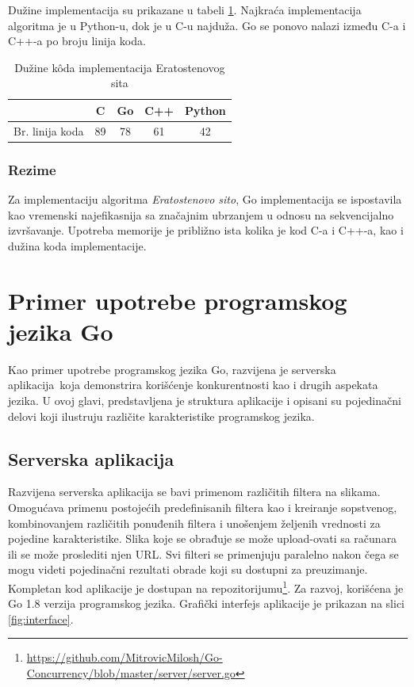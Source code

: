 \documentclass[12pt,oneside]{memoir}
\begin{document}
Dužine implementacija su prikazane u tabeli \ref{tab:prime2}. Najkraća implementacija algoritma je u Python-u, dok je u C-u najduža. Go se ponovo nalazi između C-a i C++-a po broju linija koda.

\begin{table}
\begin{center}
\caption{Dužine k\^{o}da implementacija Eratostenovog sita}
\begin{tabular}{|c|c|c|c|c|}
\hline
		&  C  		&Go 	& C++ & Python 	 \\ \hline
Br. linija koda& 89		& 78	&61	&42		 \\ \hline
\end{tabular}
\label{tab:prime2}
\end{center}
\end{table}


\subsection{Rezime}

Za implementaciju algoritma \textit{Eratostenovo sito}, Go implementacija se ispostavila kao vremenski najefikasnija sa značajnim ubrzanjem u odnosu na sekvencijalno izvršavanje. Upotreba memorije je približno ista kolika je kod C-a i C++-a, kao i dužina koda implementacije.


\chapter{Primer upotrebe programskog jezika Go}

Kao primer upotrebe programskog jezika Go, razvijena je serverska aplikacija\ koja demonstrira korišćenje konkurentnosti kao i drugih aspekata jezika. U ovoj glavi, predstavljena je struktura aplikacije i opisani su pojedinačni delovi koji ilustruju različite karakteristike programskog jezika. 

\section{Serverska aplikacija}

Razvijena serverska aplikacija se bavi primenom različitih filtera na slikama. Omogućava primenu postojećih predefinisanih filtera kao i kreiranje sopstvenog, kombinovanjem različitih ponuđenih filtera i unošenjem željenih vrednosti za pojedine karakteristike. Slika koje se obrađuje se može upload-ovati sa računara ili se može proslediti njen URL. Svi filteri se primenjuju paralelno nakon čega se mogu videti pojedinačni rezultati obrade koji su dostupni za preuzimanje. Kompletan kod aplikacije je dostupan na repozitorijumu\footnote{\url{https://github.com/MitrovicMilosh/Go-Concurrency/blob/master/server/server.go}}. Za razvoj, korišćena je Go 1.8 verzija programskog jezika. Grafički interfejs aplikacije je prikazan na slici \ref{fig:interface}.
\end{document}
